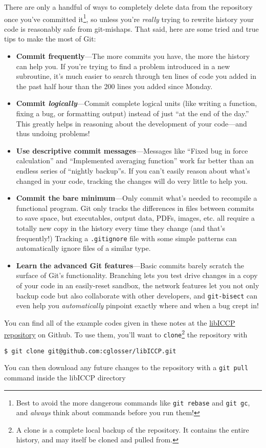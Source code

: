 There are only a handful of ways to completely delete data from the repository once you've committed it\footnote{Best to avoid the more dangerous commands like \texttt{git rebase} and \texttt{git gc}, and \emph{always} think about commands before you run them!}, so unless you're \emph{really} trying to rewrite history your code is reasonably safe from git-mishaps.
That said, here are some tried and true tips to make the most of Git:
\begin{itemize}
  \item \textbf{Commit frequently}---The more commits you have, the more the history can help you.
    If you're trying to find a problem introduced in a new subroutine, it's much easier to search through ten lines of code you added in the past half hour than the 200 lines you added since Monday.
  \item \textbf{Commit \emph{logically}}---Commit complete logical units (like writing a function, fixing a bug, or formatting output) instead of just ``at the end of the day.''
    This greatly helps in reasoning about the development of your code---and thus undoing problems!
  \item \textbf{Use descriptive commit messages}---Messages like ``Fixed bug in force calculation'' and ``Implemented averaging function'' work far better than an endless series of ``nightly backup''s.
    If you can't easily reason about what's changed in your code, tracking the changes will do very little to help you.
  \item \textbf{Commit the bare minimum}---Only commit what's needed to recompile a functional program.
    Git only tracks the differences in files between commits to save space, but executables, output data, PDFs, images, etc. all require a totally new copy in the history every time they change (and that's frequently!)
    Tracking a \texttt{.gitignore} file with some simple patterns can automatically ignore files of a similar type.
  \item \textbf{Learn the advanced Git features}---Basic commits barely scratch the surface of Git's functionality.
    Branching lets you test drive changes in a copy of your code in an easily-reset sandbox, the network features let you not only backup code but also collaborate with other developers, and \texttt{git-bisect} can even help you \emph{automatically} pinpoint exactly where and when a bug crept in!
\end{itemize}

You can find all of the example codes given in these notes at the \href{https://Github.com/cglosser/libICCP}{libICCP repository} on Github.
To use them, you'll want to \texttt{clone}\footnote{A clone is a complete local backup of the repository. It contains the entire history, and may itself be cloned and pulled from.} the repository with
\begin{verbatim}
$ git clone git@github.com:cglosser/libICCP.git
\end{verbatim}
You can then download any future changes to the repository with a \texttt{git pull} command inside the libICCP directory

